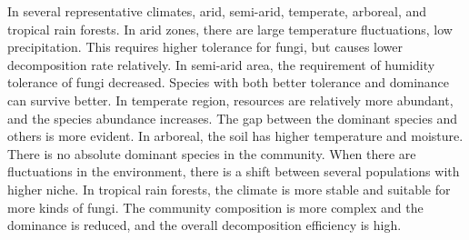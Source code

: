 \documentclass{mcmthesis}
\begin{document}
\begin{appendices}


In several representative climates, arid, semi-arid, temperate, arboreal, and tropical rain forests. In arid zones, there are large temperature fluctuations, low precipitation. This requires higher tolerance for fungi, but causes lower decomposition rate relatively. In semi-arid area, the requirement of humidity tolerance of fungi decreased. Species with both better tolerance and dominance can survive better. In temperate region, resources are relatively more abundant, and the species abundance increases. The gap between the dominant species and others is more evident. In arboreal,  the soil has higher temperature and moisture. There is no absolute dominant species in the community. When there are fluctuations in the environment, there is a shift between several populations with higher niche. In tropical rain forests, the climate is more stable and suitable for more kinds of fungi. The community composition is more complex and the dominance is reduced, and the overall decomposition efficiency is high.


\end{appendices}
\end{document}
